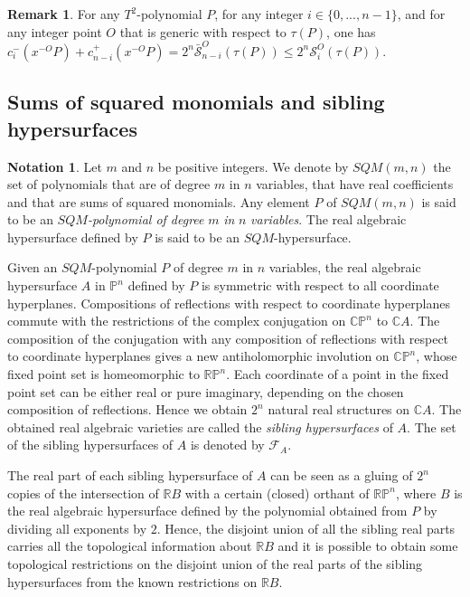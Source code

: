 \documentclass[12pt]{article}
\newcommand{\C}{\mathbb{C}}
\theoremstyle{definition}
\newtheorem{nota}{Notation}[section]
\newtheorem{rmk}{Remark}[section]
\begin{document}
\begin{rmk}
    For any $T^2$-polynomial $P$, for any integer $i \in \{0,...,n-1 \}$, and for any integer point $O$ that is generic with respect to $\tau(P)$, one has $c_i^-(x^{-O}P) + c_{n-i}^+(x^{-O}P) = 2^n \bar{\mathcal{S}}_{n-i}^O(\tau(P)) \leq 2^n \mathcal{S}^O_i(\tau(P))$.
\end{rmk}

\subsection{Sums of squared monomials and sibling hypersurfaces}

\label{section_sibling_hypersurf}

\begin{nota}
    Let $m$ and $n$ be positive integers. We denote by $SQM(m,n)$ the set of polynomials that are of degree $m$ in $n$ variables, that have real coefficients and that are sums of squared monomials. Any element $P$ of $SQM(m,n)$ is said to be an $SQM$\textit{-polynomial of degree} $m$ \textit{in} $n$ \textit{variables}. The real algebraic hypersurface defined by $P$ is said to be an $SQM$-hypersurface.
\end{nota}

\begin{sloppypar}
    Given an $SQM$-polynomial $P$ of degree $m$ in $n$ variables, the real algebraic hypersurface $A$ in $\mathbb{P}^n$ defined by $P$ is symmetric with respect to all coordinate hyperplanes. Compositions of reflections with respect to coordinate hyperplanes commute with the restrictions of the complex conjugation on $\mathbb{CP}^n$ to $\C A$. The composition of the conjugation with any composition of reflections with respect to coordinate hyperplanes gives a new antiholomorphic involution on $\mathbb{CP}^n$, whose fixed point set is homeomorphic to $\mathbb{RP}^n$. Each coordinate of a point in the fixed point set can be either real or pure imaginary, depending on the chosen composition of reflections. Hence we obtain $2^n$ natural real structures on $\mathbb{C}A$. The obtained real algebraic varieties are called the \textit{sibling hypersurfaces} of $A$. The set of the sibling hypersurfaces of $A$ is denoted by $\mathcal{F}_A$.
\end{sloppypar}

\begin{sloppypar}
    The real part of each sibling hypersurface of $A$ can be seen as a gluing of $2^n$ copies of the intersection of $\mathbb{R}B$ with a certain (closed) orthant of $\mathbb{RP}^n$, where $B$ is the real algebraic hypersurface defined by the polynomial obtained from $P$ by dividing all exponents by $2$. Hence, the disjoint union of all the sibling real parts carries all the topological information about $\mathbb{R}B$ and it is possible to obtain some topological restrictions on the disjoint union of the real parts of the sibling hypersurfaces from the known restrictions on $\mathbb{R}B$.
\end{sloppypar}
\end{document}
